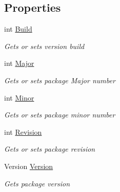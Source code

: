 \subsection*{Properties}
\begin{DoxyCompactItemize}
\item 
int \hyperlink{class_microsoft_1_1_tools_1_1_windows_device_portal_1_1_device_portal_1_1_package_version_a8e9de8fc8070e2c3cb0722b2cf9c7060}{Build}
\begin{DoxyCompactList}\small\item\em Gets or sets version build \end{DoxyCompactList}\item 
int \hyperlink{class_microsoft_1_1_tools_1_1_windows_device_portal_1_1_device_portal_1_1_package_version_ace6f2a70e320feb403039a5a21c868b4}{Major}
\begin{DoxyCompactList}\small\item\em Gets or sets package Major number \end{DoxyCompactList}\item 
int \hyperlink{class_microsoft_1_1_tools_1_1_windows_device_portal_1_1_device_portal_1_1_package_version_ab6c31a0035501b46ddd4e5b1dc8a4e57}{Minor}
\begin{DoxyCompactList}\small\item\em Gets or sets package minor number \end{DoxyCompactList}\item 
int \hyperlink{class_microsoft_1_1_tools_1_1_windows_device_portal_1_1_device_portal_1_1_package_version_a23d55ab1063eff720be949ee5040d352}{Revision}
\begin{DoxyCompactList}\small\item\em Gets or sets package revision \end{DoxyCompactList}\item 
Version \hyperlink{class_microsoft_1_1_tools_1_1_windows_device_portal_1_1_device_portal_1_1_package_version_ae5fd9e76ccbf68c26c8293f48c0a5d36}{Version}
\begin{DoxyCompactList}\small\item\em Gets package version \end{DoxyCompactList}\end{DoxyCompactItemize}


